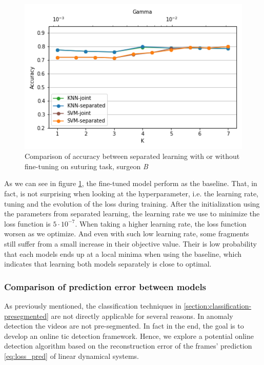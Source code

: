 \documentclass[twocolumn,10pt]{asme2ej}
\begin{document}
\begin{figure}[h]
    \centering
    \includegraphics[width=\columnwidth]{evaluation_jigsaws_accuracy_joint_vs_separated.png}
    \caption{Comparison of accuracy between separated learning with or without fine-tuning on suturing task, surgeon \textit{B}}
    \label{fig:eval-jigsaws-joint-vs-separated}
\end{figure}

As we can see in figure \ref{fig:eval-jigsaws-joint-vs-separated}, the fine-tuned model perform as the baseline. That, in fact, is not surprising when looking at the hyperparameter, i.e. the learning rate, tuning and the evolution of the loss during training. After the initialization using the parameters from separated learning, the learning rate we use to minimize the loss function is $5\cdot10^{-7}$. When taking a higher learning rate, the loss function worsen as we optimize. And even with such low learning rate, some fragments still suffer from a small increase in their objective value. Their is low probability that each models ends up at a local minima when using the baseline, which indicates that learning both models separately is close to optimal.

\subsubsection{Comparison of prediction error between models}
\label{section:pred-error}
As previously mentioned, the classification techniques in \ref{section:classification-presegmented} are not directly applicable for several reasons. In anomaly detection the videos are not pre-segmented. In fact in the end, the goal is to develop an online tic detection framework. Hence, we explore a potential online detection algorithm based on the reconstruction error of the frames' prediction \eqref{eq:loss_pred} of linear dynamical systems.
\end{document}
